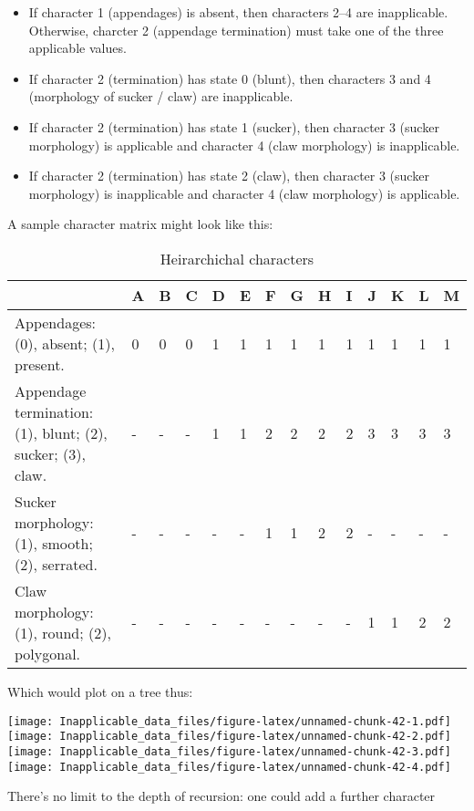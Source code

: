 \documentclass[]{book}
\theoremstyle{definition}
\theoremstyle{definition}
\theoremstyle{definition}
\theoremstyle{remark}
\begin{document}
\begin{itemize}
\item
  If character 1 (appendages) is absent, then characters 2--4 are
  inapplicable. Otherwise, charcter 2 (appendage termination) must take
  one of the three applicable values.
\item
  If character 2 (termination) has state 0 (blunt), then characters 3
  and 4 (morphology of sucker / claw) are inapplicable.
\item
  If character 2 (termination) has state 1 (sucker), then character 3
  (sucker morphology) is applicable and character 4 (claw morphology) is
  inapplicable.
\item
  If character 2 (termination) has state 2 (claw), then character 3
  (sucker morphology) is inapplicable and character 4 (claw morphology)
  is applicable.
\end{itemize}

A sample character matrix might look like this:

\begin{table}

\caption{\label{tab:unnamed-chunk-41}Heirarchichal characters}
\centering
\begin{tabular}[t]{l|l|l|l|l|l|l|l|l|l|l|l|l|l}
\hline
  & A & B & C & D & E & F & G & H & I & J & K & L & M\\
\hline
Appendages: (0), absent; (1), present. & 0 & 0 & 0 & 1 & 1 & 1 & 1 & 1 & 1 & 1 & 1 & 1 & 1\\
\hline
Appendage termination: (1), blunt; (2), sucker; (3), claw. & - & - & - & 1 & 1 & 2 & 2 & 2 & 2 & 3 & 3 & 3 & 3\\
\hline
Sucker morphology: (1), smooth; (2), serrated. & - & - & - & - & - & 1 & 1 & 2 & 2 & - & - & - & -\\
\hline
Claw morphology: (1), round; (2), polygonal. & - & - & - & - & - & - & - & - & - & 1 & 1 & 2 & 2\\
\hline
\end{tabular}
\end{table}

Which would plot on a tree thus:

\texttt{[image: Inapplicable\_data\_files/figure-latex/unnamed-chunk-42-1.pdf]}
\texttt{[image: Inapplicable\_data\_files/figure-latex/unnamed-chunk-42-2.pdf]}
\texttt{[image: Inapplicable\_data\_files/figure-latex/unnamed-chunk-42-3.pdf]}
\texttt{[image: Inapplicable\_data\_files/figure-latex/unnamed-chunk-42-4.pdf]}

There's no limit to the depth of recursion: one could add a further
character
\end{document}
